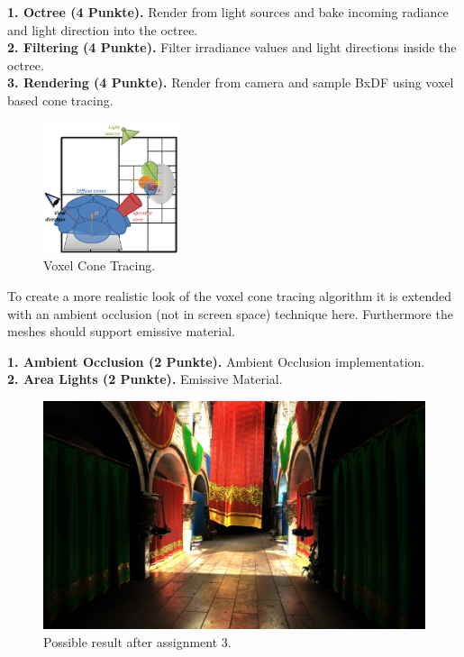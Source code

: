 \documentclass[A4paper]{gdv/gdv}
\newcommand{\teilaufgabe}[1]{\textbf{#1.}}
\begin{document}
\begin{gdvSheet}
\teilaufgabe{1. Octree (4 Punkte)} Render from light sources and bake incoming radiance and light direction into the octree. \\
\teilaufgabe{2. Filtering (4 Punkte)} Filter irradiance values and light directions inside the octree. \\
\teilaufgabe{3. Rendering (4 Punkte)} Render from camera and sample BxDF using voxel based cone tracing. \\

\begin{figure}[h]
\centering
\includegraphics[width=150px]{img/voxel.png}
\caption{Voxel Cone Tracing.}
\end{figure}
  
To create a more realistic look of the voxel cone tracing algorithm it is extended with an ambient occlusion (not in screen space) technique here. Furthermore the meshes should support emissive material.

\teilaufgabe{1. Ambient Occlusion (2 Punkte)} Ambient Occlusion implementation. \\
\teilaufgabe{2. Area Lights (2 Punkte)} Emissive Material. \\

\begin{figure}[h]
\centering
\includegraphics[width=450px]{img/sponza-voxelcone.jpg}
\caption{Possible result after assignment 3.}
\end{figure}


\end{gdvSheet}
\end{document}
